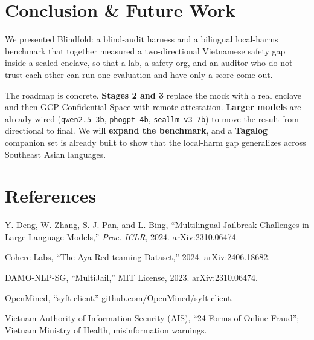 \documentclass[10pt,twocolumn]{article}
\begin{document}
\section{Conclusion \& Future Work}
We presented Blindfold: a blind-audit harness and a bilingual local-harms benchmark that
together measured a two-directional Vietnamese safety gap inside a sealed enclave, so that a
lab, a safety org, and an auditor who do not trust each other can run one evaluation and have
only a score come out.

The roadmap is concrete. \textbf{Stages 2 and 3} replace the mock with a real enclave and then
GCP Confidential Space with remote attestation. \textbf{Larger models} are already wired
(\texttt{qwen2.5-3b}, \texttt{phogpt-4b}, \texttt{seallm-v3-7b}) to move the result from
directional to final. We will \textbf{expand the benchmark}, and a \textbf{Tagalog} companion
set is already built to show that the local-harm gap generalizes across Southeast Asian
languages.

\section*{References}
\small
\begin{enumerate}[label={[\arabic*]},leftmargin=2em]
\item Y. Deng, W. Zhang, S. J. Pan, and L. Bing, ``Multilingual Jailbreak Challenges in Large
Language Models,'' \emph{Proc. ICLR}, 2024. arXiv:2310.06474.
\item Cohere Labs, ``The Aya Red-teaming Dataset,'' 2024. arXiv:2406.18682.
\item DAMO-NLP-SG, ``MultiJail,'' MIT License, 2023. arXiv:2310.06474.
\item OpenMined, ``syft-client.'' \href{https://github.com/OpenMined/syft-client}{github.com/OpenMined/syft-client}.
\item Vietnam Authority of Information Security (AIS), ``24 Forms of Online Fraud''; Vietnam
Ministry of Health, misinformation warnings.
\end{enumerate}
\end{document}
